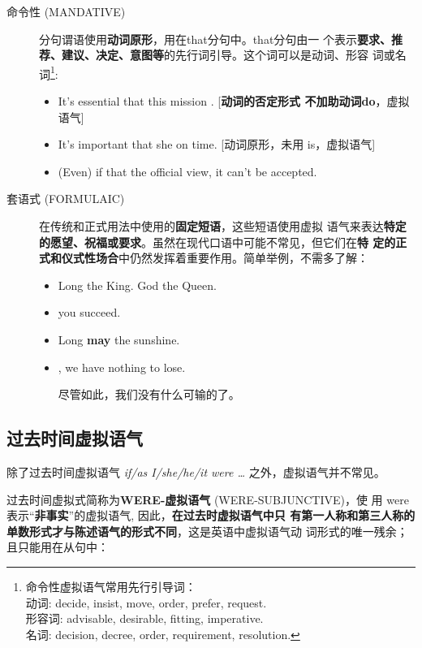 \begin{description}
\item[命令性 (MANDATIVE)] 分句谓语使用\textbf{动词原形}，用在that分句中。that分句由一
  个表示\textbf{要求、推荐、建议、决定、意图等}的先行词引导。这个词可以是动词、形容
  词或名词\footnote{命令性虚拟语气常用先行引导词：\\ 动词: decide, insist, move,
    order,
    prefer, request.\\ 形容词: advisable, desirable, fitting, imperative.\\
    名词: decision, decree, order, requirement, resolution.}:
  \begin{itemize}
  \item It's essential that this mission . [\textbf{动词的否定形式
    不加助动词do}，虚拟语气]
  \item It's important that she  on time. [动词原形，未用 is，虚拟语气]
  \item (Even) if that  the official view, it can't be accepted.
  \end{itemize}

\item[套语式 (FORMULAIC)] 在传统和正式用法中使用的\textbf{固定短语}，这些短语使用虚拟
  语气来表达\textbf{特定的愿望、祝福或要求}。虽然在现代口语中可能不常见，但它们在\textbf{特
    定的正式和仪式性场合}中仍然发挥着重要作用。简单举例，不需多了解：
  \begin{itemize}
  \item Long  the King. God  the Queen.
  \item {} you succeed.
  \item Long \textbf{may} the sunshine.
  \item {}, we have nothing to lose.

    尽管如此，我们没有什么可输的了。
  \end{itemize}
\end{description}


\subsection{过去时间虚拟语气}

除了过去时间虚拟语气 \emph{if/as I/she/he/it were \ldots{} }之外，虚拟语气并不常见。

过去时间虚拟式简称为\textbf{WERE-虚拟语气} (WERE-SUBJUNCTIVE)，使
用 were表示“\textbf{非事实}”的虚拟语气, 因此，\textbf{在过去时虚拟语气中只
  有第一人称和第三人称的单数形式才与陈述语气的形式不同}，这是英语中虚拟语气动
词形式的唯一残余；且只能用在从句中：

